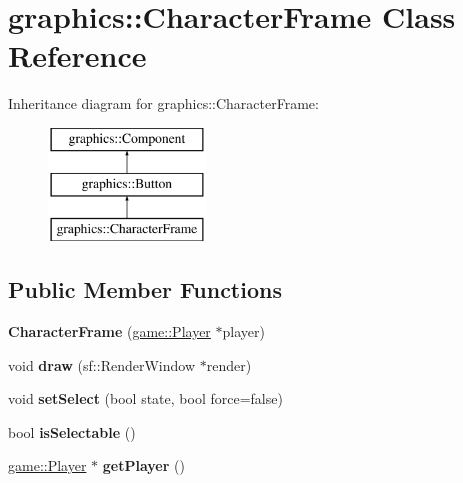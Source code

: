 \hypertarget{classgraphics_1_1_character_frame}{\section{graphics\-:\-:Character\-Frame Class Reference}
\label{classgraphics_1_1_character_frame}
}
Inheritance diagram for graphics\-:\-:Character\-Frame\-:\begin{figure}[H]
\begin{center}
\leavevmode
\includegraphics[height=3.000000cm]{classgraphics_1_1_character_frame}
\end{center}
\end{figure}
\subsection*{Public Member Functions}
\begin{DoxyCompactItemize}
\item 
\hypertarget{classgraphics_1_1_character_frame_a2fa311ef8639d779c0dd19daad00b19a}{{\bfseries Character\-Frame} (\hyperlink{classgame_1_1_player}{game\-::\-Player} $\ast$player)}\label{classgraphics_1_1_character_frame_a2fa311ef8639d779c0dd19daad00b19a}

\item 
\hypertarget{classgraphics_1_1_character_frame_ab76d34f3f315e38194db67139e72b34f}{void {\bfseries draw} (sf\-::\-Render\-Window $\ast$render)}\label{classgraphics_1_1_character_frame_ab76d34f3f315e38194db67139e72b34f}

\item 
\hypertarget{classgraphics_1_1_character_frame_a32602257ead71ecad318f28fedfda424}{void {\bfseries set\-Select} (bool state, bool force=false)}\label{classgraphics_1_1_character_frame_a32602257ead71ecad318f28fedfda424}

\item 
\hypertarget{classgraphics_1_1_character_frame_aae8bcece2ce83b8a0a029aac94725f89}{bool {\bfseries is\-Selectable} ()}\label{classgraphics_1_1_character_frame_aae8bcece2ce83b8a0a029aac94725f89}

\item 
\hypertarget{classgraphics_1_1_character_frame_abe92c28ceedd7fecdd5073d449f9dc16}{\hyperlink{classgame_1_1_player}{game\-::\-Player} $\ast$ {\bfseries get\-Player} ()}\label{classgraphics_1_1_character_frame_abe92c28ceedd7fecdd5073d449f9dc16}

\end{DoxyCompactItemize}
